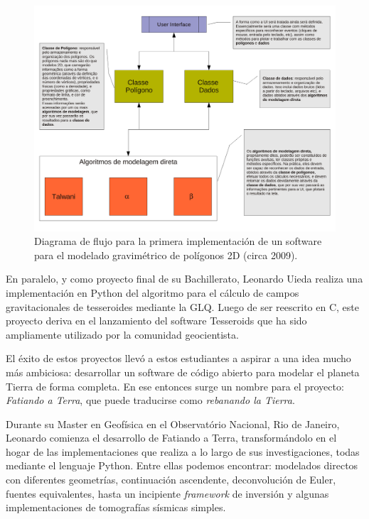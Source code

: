 \begin{figure}[h]
    \centering
    \includegraphics[width=\linewidth]{figs/fluxo-simples.pdf}
    \caption{
        Diagrama de flujo para la primera implementación de un software para el
        modelado gravimétrico de polígonos 2D
        (circa 2009).
    }
    \label{fig:talwani-idea}
\end{figure}

En paralelo, y como proyecto final de su Bachillerato, Leonardo Uieda realiza
una implementación en Python del algoritmo para el cálculo de campos
gravitacionales de tesseroides mediante la \ac{GLQ}.
Luego de ser reescrito en C, este proyecto deriva en el lanzamiento del
software Tesseroids \citep{uieda2016} que ha sido ampliamente utilizado por la
comunidad geocientista.

El éxito de estos proyectos llevó a estos estudiantes a aspirar a una idea
mucho más ambiciosa: desarrollar un software de código abierto para modelar el
planeta Tierra de forma completa.
En ese entonces surge un nombre para el proyecto: \emph{Fatiando a Terra}, que
puede traducirse como \emph{rebanando la Tierra}.

Durante su Master en Geofísica en el Observatório Nacional, Rio de Janeiro,
Leonardo comienza el desarrollo de Fatiando a Terra, transformándolo en el
hogar de las implementaciones que realiza a lo largo de sus investigaciones,
todas mediante el lenguaje Python.
Entre ellas podemos encontrar: modelados directos con diferentes geometrías,
continuación ascendente, deconvolución de Euler, fuentes equivalentes, hasta un
incipiente \emph{framework} de inversión y algunas implementaciones de
tomografías sísmicas simples.

